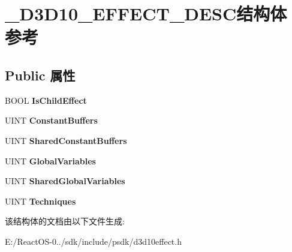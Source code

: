 \hypertarget{struct___d3_d10___e_f_f_e_c_t___d_e_s_c}{}\section{\+\_\+\+D3\+D10\+\_\+\+E\+F\+F\+E\+C\+T\+\_\+\+D\+E\+S\+C结构体 参考}
\label{struct___d3_d10___e_f_f_e_c_t___d_e_s_c}
\subsection*{Public 属性}
\begin{DoxyCompactItemize}
\item 
\mbox{\label{struct___d3_d10___e_f_f_e_c_t___d_e_s_c_ad91a45676830690456b04749afedce71}} 
B\+O\+OL {\bfseries Is\+Child\+Effect}
\item 
\mbox{\label{struct___d3_d10___e_f_f_e_c_t___d_e_s_c_a7a8f49a10e6f2d1530b5a5bf2f0cc746}} 
U\+I\+NT {\bfseries Constant\+Buffers}
\item 
\mbox{\label{struct___d3_d10___e_f_f_e_c_t___d_e_s_c_ab97e72b136029da3ccb3d4aee6d117e9}} 
U\+I\+NT {\bfseries Shared\+Constant\+Buffers}
\item 
\mbox{\label{struct___d3_d10___e_f_f_e_c_t___d_e_s_c_add9daae9f3d602043acbbada452840f8}} 
U\+I\+NT {\bfseries Global\+Variables}
\item 
\mbox{\label{struct___d3_d10___e_f_f_e_c_t___d_e_s_c_a6db1cfd01bec436d576d5a2ecfdb50f9}} 
U\+I\+NT {\bfseries Shared\+Global\+Variables}
\item 
\mbox{\label{struct___d3_d10___e_f_f_e_c_t___d_e_s_c_a7a809c918d265457bdf90b6f09fcb916}} 
U\+I\+NT {\bfseries Techniques}
\end{DoxyCompactItemize}


该结构体的文档由以下文件生成\+:\begin{DoxyCompactItemize}
\item 
E\+:/\+React\+O\+S-\/0../sdk/include/psdk/d3d10effect.\+h\end{DoxyCompactItemize}

